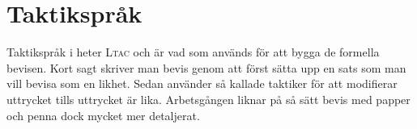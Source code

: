 \section{Taktikspråk}
Taktikspråk i \coq heter \textsc{Ltac} och är vad som används för att bygga de
formella bevisen. Kort sagt skriver man bevis genom att först sätta upp en sats
som man vill bevisa som en likhet. Sedan använder så kallade taktiker för att
modifierar uttrycket tills uttrycket är lika. Arbetsgången liknar på så sätt
bevis med papper och penna dock mycket mer detaljerat.
